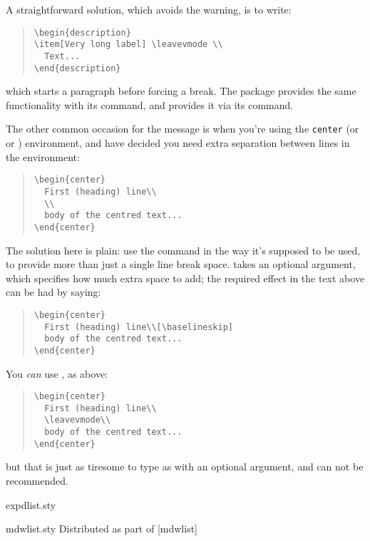 A straightforward solution, which avoids the warning, is to write:
\begin{quote}
\begin{verbatim}
\begin{description}
\item[Very long label] \leavevmode \\
  Text...
\end{description}
\end{verbatim}
\end{quote}
which starts a paragraph before forcing a break.  The
 package provides the same functionality with its
 command, and  provides it via its
 command.

The other common occasion for the message is when you're using the
\texttt{center} (or  or )
environment, and have decided you need extra separation between lines
in the environment:
\begin{quote}
\begin{verbatim}
\begin{center}
  First (heading) line\\
  \\
  body of the centred text...
\end{center}
\end{verbatim}
\end{quote}
The solution here is plain: use the \texttt{\bsbs } command in the way it's
supposed to be used, to provide more than just a single line break
space.  \texttt{\bsbs } takes an optional argument, which specifies
how much extra space to add; the required effect in the text above can
be had by saying:
\begin{quote}
\begin{verbatim}
\begin{center}
  First (heading) line\\[\baselineskip]
  body of the centred text...
\end{center}
\end{verbatim}
\end{quote}

You \emph{can} use , as above:
\begin{quote}
\begin{verbatim}
\begin{center}
  First (heading) line\\
  \leavevmode\\
  body of the centred text...
\end{center}
\end{verbatim}
\end{quote}
but that is just as tiresome to type as \texttt{\bsbs } with an optional
argument, and can not be recommended.
\begin{ctanrefs}
\item[expdlist.sty]
\item[mdwlist.sty]Distributed as part of [mdwlist]
\end{ctanrefs}

